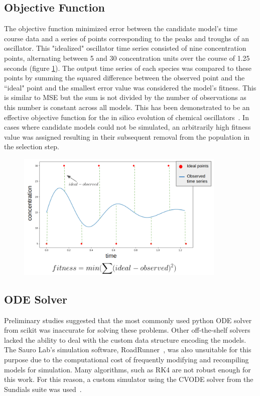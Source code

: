 \documentclass[12pt]{report}
\begin{document}
\subsection{Objective Function}

The objective function minimized error between the candidate model's time course data and a series of points corresponding to the peaks and troughs of an oscillator. This "idealized" oscillator time series consisted of nine concentration points, alternating between 5 and 30 concentration units over the course of 1.25 seconds (figure \ref{fig:fitness}). The output time series of each species was compared to these points by summing the squared difference between the observed point and the ``ideal" point and the smallest error value was considered the model's fitness. This is similar to MSE but the sum is not divided by the number of observations as this number is constant across all models. This has been demonstrated to be an effective objective function for the in silico evolution of chemical oscillators~\cite{Paladugu2006}.  In cases where candidate models could not be simulated, an arbitrarily high fitness value was assigned resulting in their subsequent removal from the population in the selection step.  

\begin{figure}
    \centering
    \includegraphics[width=10cm]{images/fitness.png}
    \label{fig:fitness}
\end{figure}

\subsection{ODE Solver}
Preliminary studies suggested that the most commonly used python ODE solver from scikit was inaccurate for solving these problems. Other off-the-shelf solvers lacked the ability to deal with the custom data structure encoding the models. The Sauro Lab's simulation software, RoadRunner~\cite{Somogyi2015}, was also unsuitable for this purpose due to the computational cost of frequently modifying and recompiling models for simulation. Many algorithms, such as RK4 are not robust enough for this work. For this reason, a custom simulator using the CVODE solver from the Sundials suite was used~\cite{hindmarsh2005sundials}. 
\end{document}
